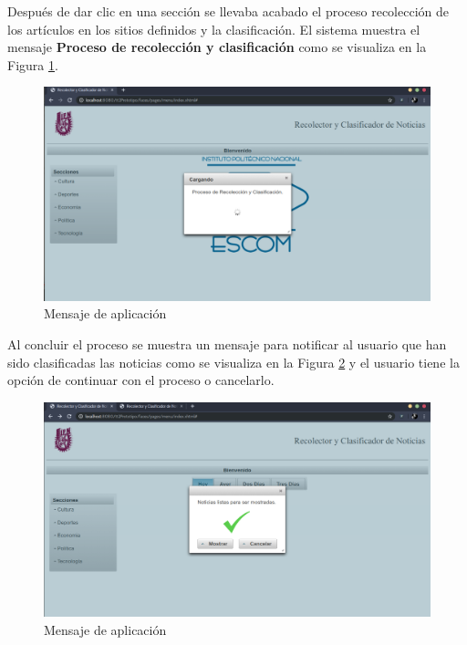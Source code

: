 Después de dar clic en una  sección se llevaba acabado el proceso recolección de los artículos en los sitios definidos  y la clasificación. El sistema muestra el mensaje \textbf{Proceso de recolección y clasificación} como se visualiza en la Figura \ref{fig:seleccionarSeccion}.

\begin{figure}[ht]
\centering
\includegraphics[scale=0.3]{imagenes/Aplicacion/seleccionarSeccion.png}
\caption{Mensaje de aplicación}
\label{fig:seleccionarSeccion}
\end{figure}

Al concluir el proceso se muestra un mensaje para notificar al usuario
que han sido clasificadas las noticias como se visualiza en la Figura \ref{fig:noticiasListas} y el usuario tiene la opción de continuar con el proceso o cancelarlo.

\begin{figure}[ht]
\centering
\includegraphics[scale=0.3]{imagenes/Aplicacion/noticiasListas.png}
\caption{Mensaje de aplicación}
\label{fig:noticiasListas}
\end{figure}

